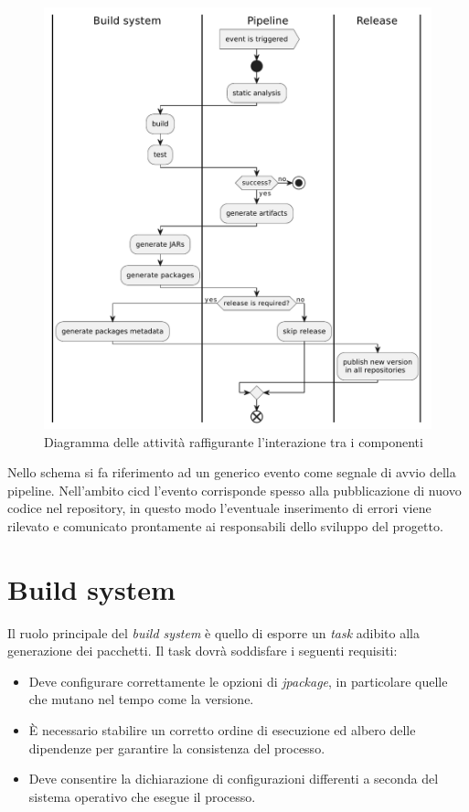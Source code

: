 \begin{figure}[htb]
	\centering
	\includegraphics[width=.9\linewidth]{figures/activity-interaction-diagram.pdf}
	\caption{Diagramma delle attività raffigurante l'interazione tra i componenti}
	\label{fig:activity-interaction-diagram}
\end{figure}

Nello schema si fa riferimento ad un generico evento come segnale di avvio della pipeline. Nell'ambito \ac{cicd} l'evento corrisponde spesso alla pubblicazione di nuovo codice nel repository, in questo modo l'eventuale inserimento di errori viene rilevato e comunicato prontamente ai responsabili dello sviluppo del progetto.

\section{Build system}

Il ruolo principale del \textit{build system} è quello di esporre un \textit{task} adibito alla generazione dei pacchetti. Il task dovrà soddisfare i seguenti requisiti:
\begin{itemize}
	\item Deve configurare correttamente le opzioni di \textit{jpackage}, in particolare quelle che mutano nel tempo come la versione.
	\item È necessario stabilire un corretto ordine di esecuzione ed albero delle dipendenze per garantire la consistenza del processo.
	\item Deve consentire la dichiarazione di configurazioni differenti a seconda del sistema operativo che esegue il processo.
\end{itemize}

